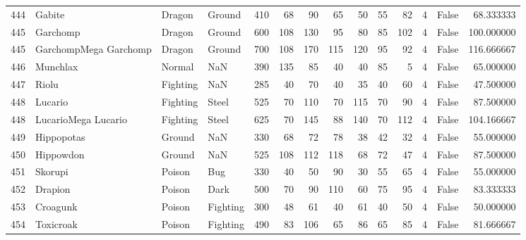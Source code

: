 \begin{tabular}{rlllrrrrrrrrlr}
 444 &                     Gabite &    Dragon &    Ground &    410 &   68 &      90 &       65 &       50 &       55 &     82 &           4 &      False &   68.333333 \\
 445 &                   Garchomp &    Dragon &    Ground &    600 &  108 &     130 &       95 &       80 &       85 &    102 &           4 &      False &  100.000000 \\
 445 &      GarchompMega Garchomp &    Dragon &    Ground &    700 &  108 &     170 &      115 &      120 &       95 &     92 &           4 &      False &  116.666667 \\
 446 &                   Munchlax &    Normal &       NaN &    390 &  135 &      85 &       40 &       40 &       85 &      5 &           4 &      False &   65.000000 \\
 447 &                      Riolu &  Fighting &       NaN &    285 &   40 &      70 &       40 &       35 &       40 &     60 &           4 &      False &   47.500000 \\
 448 &                    Lucario &  Fighting &     Steel &    525 &   70 &     110 &       70 &      115 &       70 &     90 &           4 &      False &   87.500000 \\
 448 &        LucarioMega Lucario &  Fighting &     Steel &    625 &   70 &     145 &       88 &      140 &       70 &    112 &           4 &      False &  104.166667 \\
 449 &                 Hippopotas &    Ground &       NaN &    330 &   68 &      72 &       78 &       38 &       42 &     32 &           4 &      False &   55.000000 \\
 450 &                  Hippowdon &    Ground &       NaN &    525 &  108 &     112 &      118 &       68 &       72 &     47 &           4 &      False &   87.500000 \\
 451 &                    Skorupi &    Poison &       Bug &    330 &   40 &      50 &       90 &       30 &       55 &     65 &           4 &      False &   55.000000 \\
 452 &                    Drapion &    Poison &      Dark &    500 &   70 &      90 &      110 &       60 &       75 &     95 &           4 &      False &   83.333333 \\
 453 &                   Croagunk &    Poison &  Fighting &    300 &   48 &      61 &       40 &       61 &       40 &     50 &           4 &      False &   50.000000 \\
 454 &                  Toxicroak &    Poison &  Fighting &    490 &   83 &     106 &       65 &       86 &       65 &     85 &           4 &      False &   81.666667 \\

\end{tabular}
